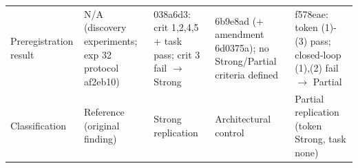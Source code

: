 \begin{table}[t]
{\begin{tabular}{p{2.6cm}p{3.6cm}p{3.6cm}p{3.6cm}p{4.2cm}}
Preregistration result & N/A (discovery experiments; exp 32 protocol af2eb10) & 038a6d3: crit 1,2,4,5 + task pass; crit 3 fail $\rightarrow$ Strong & 6b9e8ad (+ amendment 6d0375a); no Strong/Partial criteria defined & f578eae: token (1)-(3) pass; closed-loop (1),(2) fail $\rightarrow$ Partial \\
Classification & Reference (original finding) & Strong replication & Architectural control & Partial replication (token Strong, task none) \\
\bottomrule
\end{tabular}}
\end{table}
